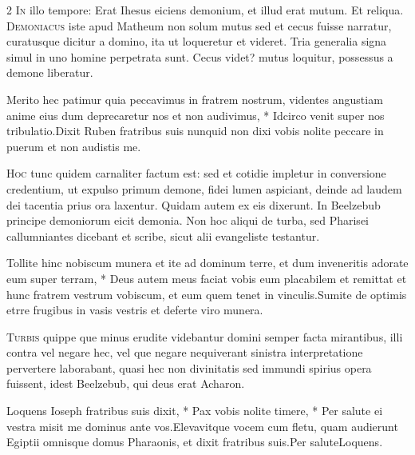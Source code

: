 \begin{multicols*}{2}
\lettrine[lines=2]{\zallmancaps \color{Blue} I}{n} illo tempore: Erat Ihesus eiciens demonium, et illud erat mutum. Et reliqua.
\lettrine[lines=2]{\zallmancaps \color{Red} D}{emoniacus} iste apud Matheum non solum mutus sed et cecus fuisse narratur, curatusque dicitur a domino, ita ut loqueretur et videret. Tria generalia signa simul in uno homine perpetrata sunt. Cecus videt? mutus loquitur, possessus a demone liberatur.
\begin{responsory}
{Merito hec patimur quia peccavimus in fratrem nostrum, videntes angustiam anime eius dum deprecaretur nos et non audivimus, * Idcirco venit super nos tribulatio.}{Dixit Ruben fratribus suis nunquid non dixi vobis nolite peccare in puerum et non audistis me.}
\end{responsory}%
\lettrine[lines=2]{\zallmancaps \color{Blue} H}{oc} tunc quidem carnaliter factum est: sed et cotidie impletur in conversione credentium, ut expulso primum demone, fidei lumen aspiciant, deinde ad laudem dei tacentia prius ora laxentur. Quidam autem ex eis dixerunt. In Beelzebub principe demoniorum eicit demonia. Non hoc aliqui de turba, sed Pharisei callumniantes dicebant et scribe, sicut alii evangeliste testantur.
\begin{responsory}
{Tollite hinc nobiscum munera et ite ad dominum terre, et dum inveneritis adorate eum super terram, * Deus autem meus faciat vobis eum placabilem et remittat et hunc fratrem vestrum vobiscum, et eum quem tenet in vinculis.}{Sumite de optimis etrre frugibus in vasis vestris et deferte viro munera.}
\end{responsory}%
\lettrine[lines=2]{\zallmancaps \color{Red} T}{urbis} quippe que minus erudite videbantur domini semper facta mirantibus, illi contra vel negare hec, vel que negare nequiverant sinistra interpretatione pervertere laborabant, quasi hec non divinitatis sed immundi spirius opera fuissent, idest Beelzebub, qui deus erat Acharon.
\begin{responsory-final}
{Loquens Ioseph fratribus suis dixit, * Pax vobis nolite timere, * Per salute ei vestra misit me dominus ante vos.}{Elevavitque vocem cum fletu, quam audierunt Egiptii omnisque domus Pharaonis, et dixit fratribus suis.}{Per salute}Loquens.
\end{responsory-final}%

\end{multicols*}

